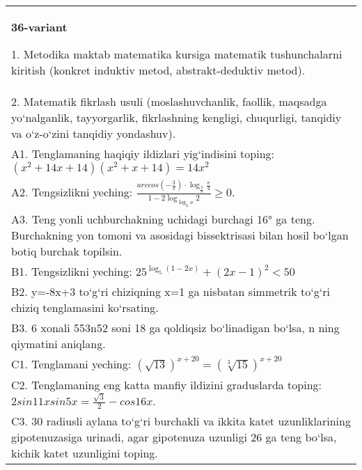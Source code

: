 \documentclass{article}
\begin{document}
\begin{tabular}{m{17cm}}
\textbf{36-variant}

1. Metodika maktab matematika kursiga matematik tushunchalarni kiritish (konkret induktiv metod, abstrakt-deduktiv metod). \\
2. Matematik fikrlash usuli (moslashuvchanlik, faollik, maqsadga yo‘nalganlik, tayyorgarlik, fikrlashning kengligi, chuqurligi, tanqidiy va o‘z-o‘zini tanqidiy yondashuv). \\
A1. Tenglamaning haqiqiy ildizlari yig‘indisini toping: \((x^2 + 14x + 14) (x^2 + x + 14) = 14x^2\) \\
A2. Tengsizlikni yeching: \(\frac{arccos (- \frac{3}{\pi}) \cdot \log_{\frac{3}{\pi}}\frac{\pi}{4}}{1 - 2\log_{\log_{2}x}2} \geq 0\). \\
A3. Teng yonli uchburchakning uchidagi burchagi 16° ga teng. Burchakning yon tomoni va asosidagi bissektrisasi bilan hosil bo‘lgan botiq burchak topilsin. \\
B1. Tengsizlikni yeching: \(25^{\log_{5}{ (1 - 2x) }} + { (2x - 1) }^{2} < 50\) \\
B2. y=-8x+3 to‘g‘ri chiziqning x=1 ga nisbatan simmetrik to‘g‘ri chiziq tenglamasini ko‘rsating. \\
B3. 6 xonali 553n52 soni 18 ga qoldiqsiz bo‘linadigan bo‘lsa, n ning qiymatini aniqlang. \\
C1. Tenglamani yeching: \((\sqrt{13}) ^{x + 20} = (\sqrt[3]{15}) ^{x + 20}\) \\
C2. Tenglamaning eng katta manfiy ildizini graduslarda toping: \(2sin11xsin5x = \frac{\sqrt{3}}{2} - cos16x\). \\
C3. 30 radiusli aylana to‘g‘ri burchakli va ikkita katet uzunliklarining gipotenuzasiga urinadi, agar gipotenuza uzunligi 26 ga teng bo‘lsa, kichik katet uzunligini toping. \\

\end{tabular}
\vspace{1cm}
\end{document}
